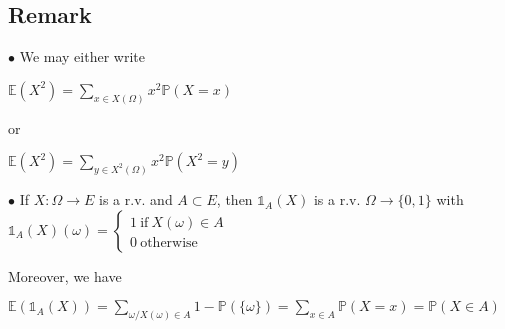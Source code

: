         \subsection{Remark}
            $\bullet$ We may either write

                \centerline{$\mathbb{E}(X^2) = \displaystyle\sum_{x\in X(\Omega)} x^2\mathbb{P}(X=x)$}

            \noindent or

                \centerline{$\mathbb{E}(X^2) = \displaystyle\sum_{y\in X^2(\Omega)} x^2\mathbb{P}(X^2=y)$}

                \vspace{5pt}

            \noindent $\bullet$ If $X:\Omega\rightarrow E$ is a r.v. and $A\subset E$, then $\mathds{1}_A(X)$ is a r.v. $\Omega\rightarrow\{0,1\}$ with $\mathds{1}_A(X)(\omega)=\begin{cases}
                    1 \: \text{if} \: X(\omega)\in A \\
                0 \: \text{otherwise}
            \end{cases}$

            \vspace{5pt}

            \noindent Moreover, we have 

            \vspace{5pt}

            \centerline{$\mathbb{E}(\mathds{1}_A(X)) = \displaystyle\sum_{\omega/X(\omega)\in A} 1 - \mathbb{P}(\{\omega\}) = \sum_{x\in A} \mathbb{P}(X=x) = \mathbb{P}(X\in A) $}

